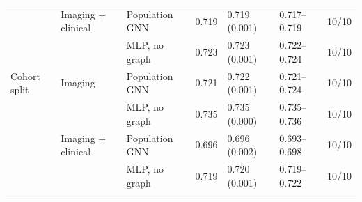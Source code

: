 \begin{tabular}{@{}lllllll@{}}
 & Imaging + clinical & Population GNN & 0.719 & 0.719 (0.001) & 0.717--0.719 & 10/10 \\
 &  & MLP, no graph & 0.723 & 0.723 (0.001) & 0.722--0.724 & 10/10 \\
Cohort split & Imaging & Population GNN & 0.721 & 0.722 (0.001) & 0.721--0.724 & 10/10 \\
 &  & MLP, no graph & 0.735 & 0.735 (0.000) & 0.735--0.736 & 10/10 \\
 & Imaging + clinical & Population GNN & 0.696 & 0.696 (0.002) & 0.693--0.698 & 10/10 \\
 &  & MLP, no graph & 0.719 & 0.720 (0.001) & 0.719--0.722 & 10/10 \\
\botrule
\end{tabular}
